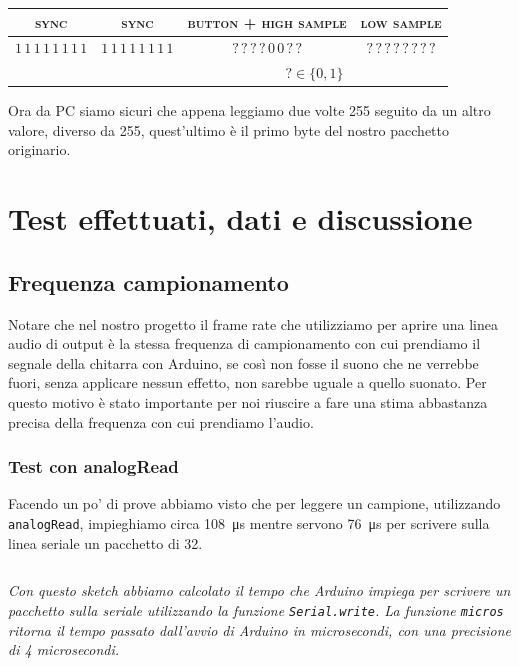 \documentclass[a4paper,11pt]{article}
\newcommand\source[2]{
	\inputminted[fontsize=\footnotesize,linenos=true,tabsize=4]{#1}{#2}
}
\begin{document}
\begin{table}[h]
\begin{tabular}{cccc}
\textsc{\color[HTML]{FE0000}sync} & \textsc{\color[HTML]{FE0000}sync} & \textsc{button + high sample} & \textsc{low sample}       \\ \hline
\multicolumn{1}{|c|}{\color[HTML]{FE0000}$1\,1\,1\,1\, 1\, 1\, 1\, 1 $} &\multicolumn{1}{|c|}{\color[HTML]{FE0000}$1\,1\,1\,1\, 1\, 1\, 1\, 1 $} &\multicolumn{1}{|c|}{${?\,?\,?\,?}\, 0\, 0\, ?\, ? $} & \multicolumn{1}{c|}{$?\,?\,?\,?\,?\,?\,?\,?$} \\ \hline
\multicolumn{2}{c}{} & \multicolumn{2}{c}{$? \in \{0, 1\}$}
\end{tabular}
\end{table}

Ora da PC siamo sicuri che appena leggiamo due volte 255 seguito da un altro valore, diverso da 255, quest'ultimo è il primo byte del nostro pacchetto originario.

\section{Test effettuati, dati e discussione}

\subsection{Frequenza campionamento}
Notare che nel nostro progetto il frame rate che utilizziamo per aprire una linea audio di output è la stessa frequenza di campionamento con cui prendiamo il segnale della chitarra con Arduino, se così non fosse il suono che ne verrebbe fuori, senza applicare nessun effetto, non sarebbe uguale a quello suonato. Per questo motivo è stato importante per noi riuscire a fare una stima abbastanza precisa della frequenza con cui prendiamo l'audio.

\subsubsection{Test con analogRead}

Facendo un po' di prove abbiamo visto che per leggere un campione, utilizzando \texttt{analogRead}, impieghiamo circa \SI{108}{\micro\second} mentre servono \SI{76}{\micro\second} per scrivere sulla linea seriale un pacchetto di \SI{32}{\bit}.

\source{cpp}{write_speed_rel}

\textit{Con questo sketch abbiamo calcolato il tempo che Arduino impiega per scrivere un pacchetto sulla seriale utilizzando la funzione \texttt{Serial.write}. La funzione \texttt{micros} ritorna il tempo passato dall'avvio di Arduino in microsecondi, con una precisione di 4 microsecondi.}
\vspace{0.2in}
\end{document}
